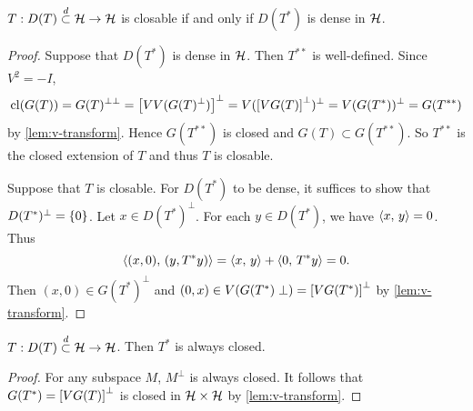 \begin{proposition}
    $T:D(T)\overset{d}{\subset}\mathcal{H}\to\mathcal{H}$ is closable if and only if $D(T^*)$ is dense in $\mathcal{H}$.
\end{proposition}
\begin{proof}
    Suppose that $D(T^*)$ is dense in $\mathcal{H}$. Then $T^{**}$ is well-defined. 
    Since $V^2 = -I$, 
    \begin{equation*}
        \operatorname{cl}(G(T)) = G(T)^{\perp\perp} = \left[ {VV(G(T)^\perp)} \right]^\perp 
        = V(\left[ {VG(T)} \right]^\perp)^\perp = V(G(T^*))^\perp = G(T^{**})
    \end{equation*}
    by \cref{lem:v-transform}. Hence $G(T^{**})$ is closed and 
    $G(T)\subset G(T^{**})$. So $T^{**}$ is the closed extension of 
    $T$ and thus $T$ is closable. 

    Suppose that $T$ is closable. For $D(T^*)$ to be dense, it 
    suffices to show that $D(T^*)^\perp = \left\{ {0} \right\}$. Let $x\in D(T^*)^\perp$. 
    For each $y\in D(T^*)$, we have $\left\langle {x},\, {y} \right\rangle = 0$. Thus 
    \begin{equation*}
        \left\langle {(x,0)},\, {(y,T^*y)} \right\rangle = \left\langle {x},\, {y} \right\rangle + \left\langle {0},\, {T^*y} \right\rangle = 0.
    \end{equation*}
    Then $(x,0)\in G(T^*)^\perp$ and $(0,x)\in V(G(T^*)\perp) = \left[ {VG(T^*)} \right]^\perp$ by 
    \cref{lem:v-transform}. 
\end{proof}

\begin{proposition}\label{prop:adjoint_closed}
    $T:D(T)\overset{d}{\subset}\mathcal{H}\to\mathcal{H}$. Then $T^*$ is always closed. 
\end{proposition}
\begin{proof}
    For any subspace $M$, $M^\perp$ is always closed. 
    It follows that $G(T^*) = \left[ {VG(T)} \right]^\perp$ is closed 
    in $\mathcal{H}\times\mathcal{H}$ by \cref{lem:v-transform}.
\end{proof}

